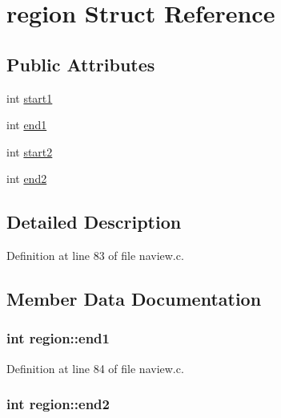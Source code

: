 \hypertarget{structregion}{\section{region Struct Reference}
\label{structregion}
}
\subsection*{Public Attributes}
\begin{DoxyCompactItemize}
\item 
int \hyperlink{structregion_a9491ab5c4e5be6d5cef854f71a75cf19}{start1}
\item 
int \hyperlink{structregion_adbc1820d966add5e3de8471acefee043}{end1}
\item 
int \hyperlink{structregion_a04cb81f51b93d18f3899b4172ea90dc2}{start2}
\item 
int \hyperlink{structregion_af19b594ce7c48d1b6c459351d4da5639}{end2}
\end{DoxyCompactItemize}


\subsection{Detailed Description}


Definition at line 83 of file naview.\+c.



\subsection{Member Data Documentation}
\hypertarget{structregion_adbc1820d966add5e3de8471acefee043}{
\subsubsection[{end1}]{\setlength{\rightskip}{0pt plus 5cm}int region\+::end1}}\label{structregion_adbc1820d966add5e3de8471acefee043}


Definition at line 84 of file naview.\+c.

\hypertarget{structregion_af19b594ce7c48d1b6c459351d4da5639}{
\subsubsection[{end2}]{\setlength{\rightskip}{0pt plus 5cm}int region\+::end2}}\label{structregion_af19b594ce7c48d1b6c459351d4da5639}


